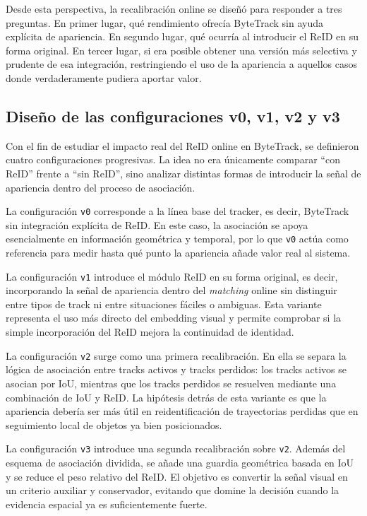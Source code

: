 \documentclass[../MAIN.tex]{subfiles}
\begin{document}
	Desde esta perspectiva, la recalibración online se diseñó para responder a tres preguntas. En primer lugar, qué rendimiento ofrecía ByteTrack sin ayuda explícita de apariencia. En segundo lugar, qué ocurría al introducir el ReID en su forma original. En tercer lugar, si era posible obtener una versión más selectiva y prudente de esa integración, restringiendo el uso de la apariencia a aquellos casos donde verdaderamente pudiera aportar valor.
	
	\subsection{Diseño de las configuraciones v0, v1, v2 y v3}
	
	Con el fin de estudiar el impacto real del ReID online en ByteTrack, se definieron cuatro configuraciones progresivas. La idea no era únicamente comparar ``con ReID'' frente a ``sin ReID'', sino analizar distintas formas de introducir la señal de apariencia dentro del proceso de asociación.
	
	La configuración \texttt{v0} corresponde a la línea base del tracker, es decir, ByteTrack sin integración explícita de ReID. En este caso, la asociación se apoya esencialmente en información geométrica y temporal, por lo que \texttt{v0} actúa como referencia para medir hasta qué punto la apariencia añade valor real al sistema.
	
	La configuración \texttt{v1} introduce el módulo ReID en su forma original, es decir, incorporando la señal de apariencia dentro del \textit{matching} online sin distinguir entre tipos de track ni entre situaciones fáciles o ambiguas. Esta variante representa el uso más directo del embedding visual y permite comprobar si la simple incorporación del ReID mejora la continuidad de identidad.
	
	La configuración \texttt{v2} surge como una primera recalibración. En ella se separa la lógica de asociación entre tracks activos y tracks perdidos: los tracks activos se asocian por IoU, mientras que los tracks perdidos se resuelven mediante una combinación de IoU y ReID. La hipótesis detrás de esta variante es que la apariencia debería ser más útil en reidentificación de trayectorias perdidas que en seguimiento local de objetos ya bien posicionados.
	
	La configuración \texttt{v3} introduce una segunda recalibración sobre \texttt{v2}. Además del esquema de asociación dividida, se añade una guardia geométrica basada en IoU y se reduce el peso relativo del ReID. El objetivo es convertir la señal visual en un criterio auxiliar y conservador, evitando que domine la decisión cuando la evidencia espacial ya es suficientemente fuerte.
	
\end{document}
